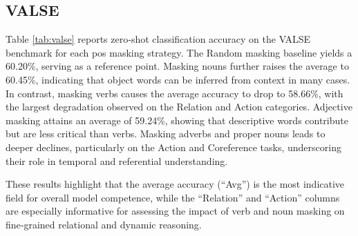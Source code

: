 \subsection{VALSE}
Table \ref{tab:valse} reports zero‐shot classification accuracy on the VALSE benchmark for each \acrshort{pos} masking strategy.  
The Random masking baseline yields a 60.20\%, serving as a reference point.  
Masking nouns further raises the average to 60.45\%, indicating that object words can be inferred from context in many cases.  
In contrast, masking verbs causes the average accuracy to drop to 58.66\%, with the largest degradation observed on the Relation and Action categories.  
Adjective masking attains an average of 59.24\%, showing that descriptive words contribute but are less critical than verbs.  
Masking adverbs and proper nouns leads to deeper declines, particularly on the Action and Coreference tasks, underscoring their role in temporal and referential understanding.  

These results highlight that the average accuracy (“Avg”) is the most indicative field for overall model competence, while the “Relation” and “Action” columns are especially informative for assessing the impact of verb and noun masking on fine‐grained relational and dynamic reasoning.

